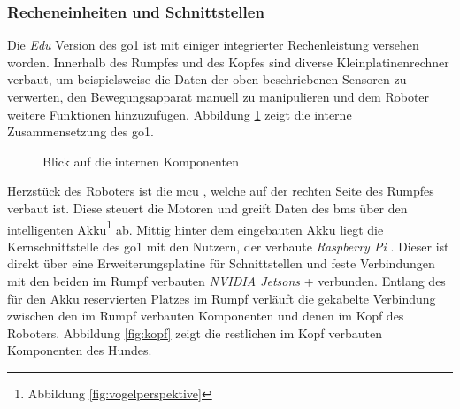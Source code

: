 \subsubsection{Recheneinheiten und Schnittstellen}
\label{subsubsec:recheneinheiten}

Die \emph{Edu} Version des \gls{go1} ist mit einiger integrierter Rechenleistung versehen worden.
Innerhalb des Rumpfes und des Kopfes sind diverse Kleinplatinenrechner verbaut, um beispielsweise die Daten der oben beschriebenen
Sensoren zu verwerten, den Bewegungsapparat manuell zu manipulieren und dem Roboter weitere Funktionen hinzuzufügen.
Abbildung \ref{fig:intern} zeigt die interne Zusammensetzung des \gls{go1}.

\begin{figure}[h]
    \caption{Blick auf die internen Komponenten}\label{fig:intern}
\end{figure}

Herzstück des Roboters ist die \gls{mcu} , welche auf der rechten Seite des Rumpfes verbaut ist.
Diese steuert die Motoren und greift Daten des \gls{bms}  über den intelligenten Akku\footnote{Abbildung \ref{fig:vogelperspektive} }
ab.
Mittig hinter dem eingebauten Akku liegt die Kernschnittstelle des \gls{go1} mit den Nutzern, der verbaute \emph{Raspberry Pi}
.
Dieser ist direkt über eine Erweiterungsplatine  für Schnittstellen und feste Verbindungen mit den beiden im Rumpf
verbauten \emph{NVIDIA Jetsons} + verbunden.
Entlang des für den Akku reservierten Platzes im Rumpf verläuft die gekabelte Verbindung 
zwischen den im Rumpf verbauten Komponenten und denen im Kopf des Roboters.
Abbildung \ref{fig:kopf} zeigt die restlichen im Kopf verbauten Komponenten des Hundes.

